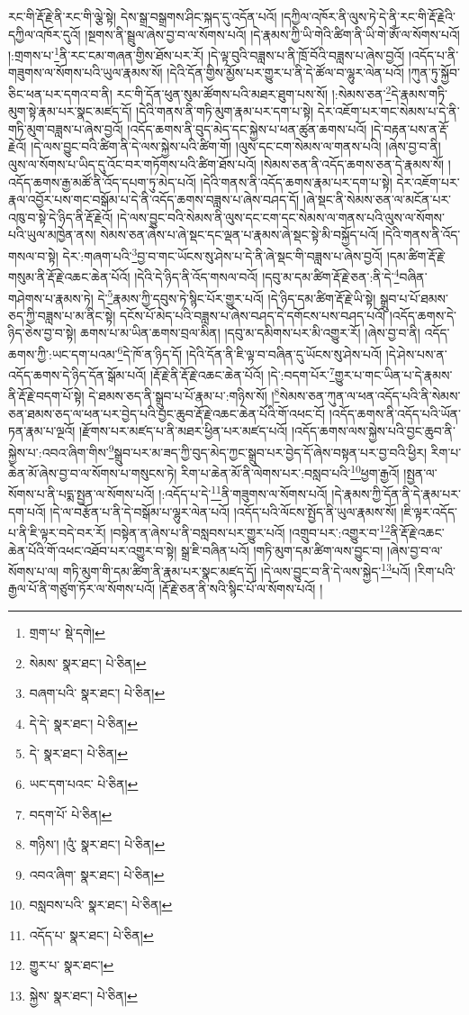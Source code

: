 རང་གི་རྡོ་རྗེ་ནི་རང་གི་ལྕེ་སྟེ། དེས་སྒྲ་བསྒྲགས་ཤིང་སྐད་དུ་འདོན་པའོ། །དཀྱིལ་འཁོར་ནི་ལུས་ཏེ་དེ་ནི་རང་གི་རྡོ་རྗེའི་དཀྱིལ་འཁོར་དུའོ། །སྔགས་ནི་སྦྲུལ་ཞེས་བྱ་བ་ལ་སོགས་པའོ། །དེ་རྣམས་ཀྱི་ཡི་གེའི་ཚིག་ནི་ཡི་གེ་ཨོཾ་ལ་སོགས་པའོ། །:གྲགས་པ་\footnote{གྲག་པ་  སྡེ་དགེ། }ནི་རང་ངམ་གཞན་གྱིས་ཐོས་པར་རོ། །དེ་ལྟ་བུའི་བཟླས་པ་ནི་ཁྲོ་བོའི་བཟླས་པ་ཞེས་བྱའོ། །འདོད་པ་ནི་གཟུགས་ལ་སོགས་པའི་ཡུལ་རྣམས་སོ། །དེའི་དོན་གྱིས་མྱོས་པར་གྱུར་པ་ནི་དེ་ཚོལ་བ་ལྷུར་ལེན་པའོ། །ཀུན་ཏུ་སྐྱོབ་ཅིང་ཕན་པར་དགའ་བ་ནི། རང་གི་དོན་ཕུན་སུམ་ཚོགས་པའི་མཐར་ཐུག་པས་སོ། །:སེམས་ཅན་\footnote{སེམས་  སྣར་ཐང་།  པེ་ཅིན། }དེ་རྣམས་གཏི་མུག་སྟེ་རྣམ་པར་སྣང་མཛད་དོ། །དེའི་གནས་ནི་གཏི་མུག་རྣམ་པར་དག་པ་སྟེ། དེར་འཇོག་པར་གང་སེམས་པ་དེ་ནི་གཏི་མུག་བཟླས་པ་ཞེས་བྱའོ། །འདོད་ཆགས་ནི་བུད་མེད་དང་སྐྱེས་པ་ཕན་ཚུན་ཆགས་པའོ། །དེ་བརྟན་པས་ན་རྡོ་རྗེའོ། །དེ་ལས་བྱུང་བའི་ཚིག་ནི་དེ་ལས་སྐྱེས་པའི་ཚིག་གོ། །ལུས་དང་ངག་སེམས་ལ་གནས་པའི། །ཞེས་བྱ་བ་ནི། ལུས་ལ་སོགས་པ་ཡིད་དུ་འོང་བར་གཏོགས་པའི་ཚིག་ཐོས་པའོ། །སེམས་ཅན་ནི་འདོད་ཆགས་ཅན་དེ་རྣམས་སོ། །འདོད་ཆགས་རྒྱ་མཚོ་ནི་འོད་དཔག་ཏུ་མེད་པའོ། །དེའི་གནས་ནི་འདོད་ཆགས་རྣམ་པར་དག་པ་སྟེ། དེར་འཇོག་པར་རྣལ་འབྱོར་པས་གང་བསྒོམ་པ་དེ་ནི་འདོད་ཆགས་བཟླས་པ་ཞེས་བཤད་དོ། །ཞེ་སྡང་ནི་སེམས་ཅན་ལ་མངོན་པར་འཁུ་བ་སྟེ་དེ་ཉིད་ནི་རྡོ་རྗེའོ། །དེ་ལས་བྱུང་བའི་སེམས་ནི་ལུས་དང་ངག་དང་སེམས་ལ་གནས་པའི་ལུས་ལ་སོགས་པའི་ཡུལ་མཁྱེན་ནས། སེམས་ཅན་ཞེས་པ་ཞེ་སྡང་དང་ལྡན་པ་རྣམས་ཞེ་སྡང་སྟེ་མི་བསྐྱོད་པའོ། །དེའི་གནས་ནི་འོད་གསལ་བ་སྟེ། དེར་:གཞག་པའི་\footnote{བཞག་པའི་  སྣར་ཐང་།  པེ་ཅིན། }བྱ་བ་གང་ཡོངས་སུ་ཤེས་པ་དེ་ནི་ཞེ་སྡང་གི་བཟླས་པ་ཞེས་བྱའོ། །དམ་ཚིག་རྡོ་རྗེ་གསུམ་ནི་རྡོ་རྗེ་འཆང་ཆེན་པོའོ། །དེའི་དེ་ཉིད་ནི་འོད་གསལ་བའོ། །དབུ་མ་དམ་ཚིག་རྡོ་རྗེ་ཅན་:ནི་དེ་\footnote{དེ་དེ་  སྣར་ཐང་།  པེ་ཅིན། }བཞིན་གཤེགས་པ་རྣམས་ཏེ། དེ་\footnote{དེ་  སྣར་ཐང་།  པེ་ཅིན། }རྣམས་ཀྱི་དབུས་ཏེ་སྙིང་པོར་གྱུར་པའོ། །དེ་ཉིད་དམ་ཚིག་རྡོ་རྗེ་ཡི་སྟེ། སྒྲུབ་པ་པོ་ཐམས་ཅད་ཀྱི་བཟླས་པ་མ་ནིང་སྟེ། དངོས་པོ་མེད་པའི་བཟླས་པ་ཞེས་བཤད་དེ་དགོངས་པས་བཤད་པའོ། །འདོད་ཆགས་དེ་ཉིད་ཅེས་བྱ་བ་སྟེ། ཆགས་པ་མ་ཡིན་ཆགས་བྲལ་མིན། །དབུ་མ་དམིགས་པར་མི་འགྱུར་རོ། །ཞེས་བྱ་བ་ནི། འདོད་ཆགས་ཀྱི་:ཡང་དག་པའམ་\footnote{ཡང་དག་པའང་  པེ་ཅིན། }དེ་ཁོ་ན་ཉིད་དོ། །དེའི་དོན་ནི་ཇི་ལྟ་བ་བཞིན་དུ་ཡོངས་སུ་ཤེས་པའོ། །དེ་ཤེས་པས་ན་འདོད་ཆགས་དེ་ཉིད་དོན་སྒོམ་པའོ། །རྡོ་རྗེ་ནི་རྡོ་རྗེ་འཆང་ཆེན་པོའོ། །དེ་:བདག་པོར་\footnote{བདག་པོ་  པེ་ཅིན། }གྱུར་པ་གང་ཡིན་པ་དེ་རྣམས་ནི་རྡོ་རྗེ་བདག་པོ་སྟེ། དེ་ཐམས་ཅད་ནི་སྒྲུབ་པ་པོ་རྣམ་པ་:གཉིས་སོ། །\footnote{གཉིས་། །འུཾ་  སྣར་ཐང་།  པེ་ཅིན། }སེམས་ཅན་ཀུན་ལ་ཕན་འདོད་པའི་ནི་སེམས་ཅན་ཐམས་ཅད་ལ་ཕན་པར་བྱེད་པའི་བྱང་ཆུབ་རྡོ་རྗེ་འཆང་ཆེན་པོའི་གོ་འཕང་ངོ། །འདོད་ཆགས་ནི་འདོད་པའི་ཡོན་ཏན་རྣམ་པ་ལྔའོ། །རྫོགས་པར་མཛད་པ་ནི་མཐར་ཕྱིན་པར་མཛད་པའོ། །འདོད་ཆགས་ལས་སྐྱེས་པའི་བྱང་ཆུབ་ནི་སྐྱེས་པ་:འབའ་ཞིག་གིས་\footnote{འབའ་ཞིག་  སྣར་ཐང་།  པེ་ཅིན། }སྒྲུབ་པར་མ་ཟད་ཀྱི་བུད་མེད་ཀྱང་སྒྲུབ་པར་བྱེད་དོ་ཞེས་བསྟན་པར་བྱ་བའི་ཕྱིར། རིག་པ་ཆེན་མོ་ཞེས་བྱ་བ་ལ་སོགས་པ་གསུངས་ཏེ། རིག་པ་ཆེན་མོ་ནི་ལེགས་པར་:བསླབ་པའི་\footnote{བསླབས་པའི་  སྣར་ཐང་།  པེ་ཅིན། }ཕྱག་རྒྱའོ། །སྤྱན་ལ་སོགས་པ་ནི་པདྨ་སྤྱན་ལ་སོགས་པའོ། །:འདོད་པ་དེ་\footnote{འདོད་པ་  སྣར་ཐང་།  པེ་ཅིན། }ནི་གཟུགས་ལ་སོགས་པའོ། །དེ་རྣམས་ཀྱི་དོན་ནི་དེ་རྣམ་པར་དག་པའོ། །དེ་ལ་བརྩོན་པ་ནི་དེ་བསྒོམ་པ་ལྷུར་ལེན་པའོ། །འདོད་པའི་ལོངས་སྤྱོད་ནི་ཡུལ་རྣམས་སོ། །ཇི་ལྟར་འདོད་པ་ནི་ཇི་ལྟར་བདེ་བར་རོ། །བསྟེན་ན་ཞེས་པ་ནི་བསླབས་པར་གྱུར་པའོ། །འགྲུབ་པར་:འགྱུར་བ་\footnote{གྱུར་པ་  སྣར་ཐང་། }ནི་རྡོ་རྗེ་འཆང་ཆེན་པོའི་གོ་འཕང་འཐོབ་པར་འགྱུར་བ་སྟེ། སྒྲ་ཇི་བཞིན་པའོ། །གཏི་མུག་དམ་ཚིག་ལས་བྱུང་བ། །ཞེས་བྱ་བ་ལ་སོགས་པ་ལ། གཏི་མུག་གི་དམ་ཚིག་ནི་རྣམ་པར་སྣང་མཛད་དོ། །དེ་ལས་བྱུང་བ་ནི་དེ་ལས་སྐྱེད་\footnote{སྐྱེས་  སྣར་ཐང་།  པེ་ཅིན། }པའོ། །རིག་པའི་རྒྱལ་པོ་ནི་གཙུག་ཏོར་ལ་སོགས་པའོ། །རྡོ་རྗེ་ཅན་ནི་སའི་སྙིང་པོ་ལ་སོགས་པའོ། །

